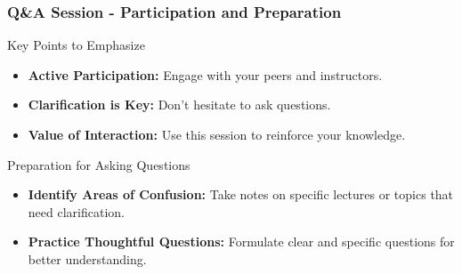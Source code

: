\documentclass[aspectratio=169]{beamer}
\begin{document}
\begin{frame}[fragile]
  \frametitle{Q\&A Session - Participation and Preparation}
  \begin{block}{Key Points to Emphasize}
    \begin{itemize}
      \item \textbf{Active Participation:} Engage with your peers and instructors.
      \item \textbf{Clarification is Key:} Don’t hesitate to ask questions.
      \item \textbf{Value of Interaction:} Use this session to reinforce your knowledge.
    \end{itemize}
  \end{block}

  \begin{block}{Preparation for Asking Questions}
    \begin{itemize}
      \item \textbf{Identify Areas of Confusion:} Take notes on specific lectures or topics that need clarification.
      \item \textbf{Practice Thoughtful Questions:} Formulate clear and specific questions for better understanding.
    \end{itemize}
  \end{block}
\end{frame}
\end{document}
